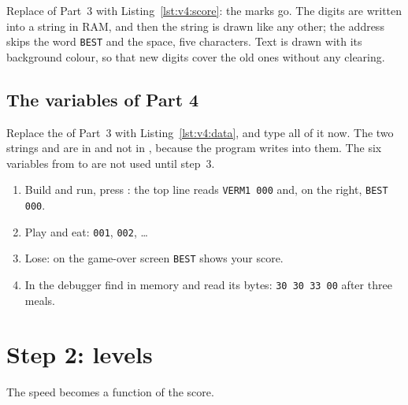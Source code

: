 
Replace  of Part~3 with Listing~\ref{lst:v4:score}: the
marks go. The digits are written into a string in RAM, and then the string is
drawn like any other; the address  skips the word
\texttt{BEST} and the space, five characters. Text is drawn with its
background colour, so that new digits cover the old ones without any
clearing.

\subsection{The variables of Part 4}


Replace the  of Part~3 with Listing~\ref{lst:v4:data}, and type
all of it now. The two strings  and  are in
 and not in , because the program writes into them.
The six variables from  to  are not used until
step~3.

\begin{prgcheck}
\begin{enumerate}[nosep]
\item Build and run, press : the top line reads \texttt{VERM1 000} and,
  on the right, \texttt{BEST 000}.
\item Play and eat: \texttt{001}, \texttt{002}, \ldots
\item Lose: on the game-over screen \texttt{BEST} shows your score.
\item In the debugger find  in memory and read its bytes:
  \texttt{30 30 33 00} after three meals.
\end{enumerate}
\end{prgcheck}

\section{Step 2: levels}

The speed becomes a function of the score.


